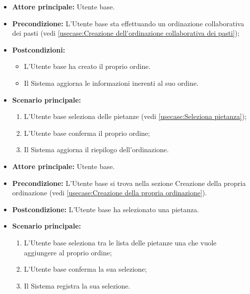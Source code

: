 \label{usecase:Creazione della propria ordinazione}
\begin{itemize}
	\item \textbf{Attore principale:} Utente base.

	\item \textbf{Precondizione:} L'Utente base sta effettuando un ordinazione collaborativa dei pasti (vedi \autoref{usecase:Creazione dell'ordinazione collaborativa dei pasti});

	\item \textbf{Postcondizioni:}
	      \begin{itemize}
		      \item L'Utente base ha creato il proprio ordine.
		      \item Il Sistema aggiorna le informazioni inerenti al suo ordine.
	      \end{itemize}

	\item \textbf{Scenario principale:}
	      \begin{enumerate}
		      \item L'Utente base seleziona delle pietanze (vedi \autoref{usecase:Seleziona pietanza});
		      \item L'Utente base conferma il proprio ordine;
		      \item Il Sistema aggiorna il riepilogo dell'ordinazione.
	      \end{enumerate}
\end{itemize}


\label{usecase:Seleziona pietanza}
\begin{itemize}
	\item \textbf{Attore principale:} Utente base.

	\item \textbf{Precondizione:} L'Utente base si trova nella sezione Creazione della propria ordinazione (vedi \autoref{usecase:Creazione della propria ordinazione}).

	\item \textbf{Postcondizione:} L'Utente base ha selezionato una pietanza.

	\item \textbf{Scenario principale:}
	      \begin{enumerate}
		      \item L'Utente base seleziona tra le lista delle pietanze una che vuole aggiungere al proprio ordine;
		      \item L'Utente base conferma la sua selezione;
		      \item Il Sistema registra la sua selezione.
	      \end{enumerate}
\end{itemize}

